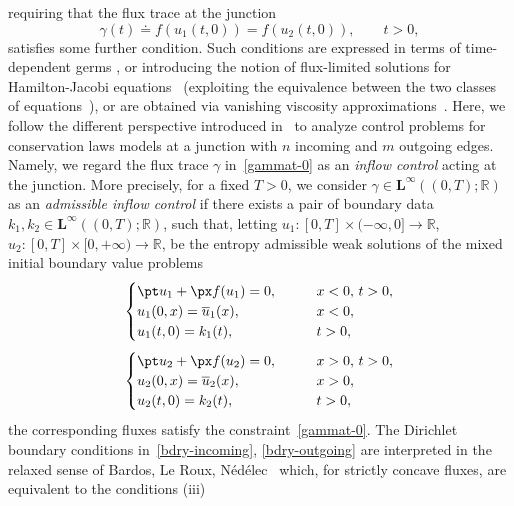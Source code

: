 \documentclass[a4paper, 10pt, final]{article}
\newcommand{\R}{\mathbb{R}} \newcommand{\N}{\mathbb{N}}
\begin{document}
requiring that the flux trace at the junction
\begin{equation}\label{gammat-0} \gamma(t)\doteq f(u_1(t,0)) = f(u_2(t, 0)),
\qquad t>0,\end{equation}
satisfies some further condition. 
Such conditions are expressed in terms of time-dependent germs \cite{akr,cardsolo}, or introducing the notion of flux-limited solutions 
for Hamilton-Jacobi equations~\cite{im} (exploiting the equivalence between the two classes of equations~\cite{card1}), 
or are obtained via vanishing viscosity approximations~\cite{cg}.
Here, we follow the different perspective introduced in~\cite{accg}
to analyze control problems for conservation laws
models at a junction with $n$ incoming and $m$ outgoing edges. Namely,   
we regard the flux trace $\gamma$ in~\eqref{gammat-0} as an {\it inflow control}
acting at the junction.
More precisely, for a fixed $T>0$, 
we consider
$\gamma\in \mathbf{L^\infty}((0,T);\R)$
as an {\it admissible inflow control}
if there exists a pair of boundary data 
$k_1, k_2 \in \mathbf{L^\infty}\left((0,T); \R \right)$,
such that, letting $u_1:[0,T]\times (-\infty,0]\to\R$, $u_2:[0,T]\times [0,+\infty)\to\R$, be the entropy admissible weak solutions of the mixed initial boundary value problems
%
\begin{equation}
  \label{bdry-incoming} 
  \begin{cases} \pt u_1 +\px f(u_1)=0, \qquad & x<0, \, t>0,\\ 
    u_1(0,x)= \overline u_1(x), & x<0,\\
    u_1(t,0)= k_1(t), & t>0,\end{cases}
\end{equation} 
%
%
\begin{equation}
  \label{bdry-outgoing} 
  \begin{cases} \pt u_2 +\px f(u_2)=0, \qquad & x>0, \, t>0,\\ 
    u_2(0,x)= \overline u_2(x), & x>0,\\
    u_2(t,0)= k_2(t), & t>0,\end{cases}
\end{equation} 
%
the corresponding fluxes satisfy the  
constraint~\eqref{gammat-0}.
The Dirichlet boundary conditions in~\eqref{bdry-incoming}, \eqref{bdry-outgoing}
are 
interpreted in the relaxed sense 
of Bardos, Le Roux, N\'ed\'elec~\cite{BLN} which, for strictly concave fluxes, 
are equivalent to the conditions (iii)
\end{document}

